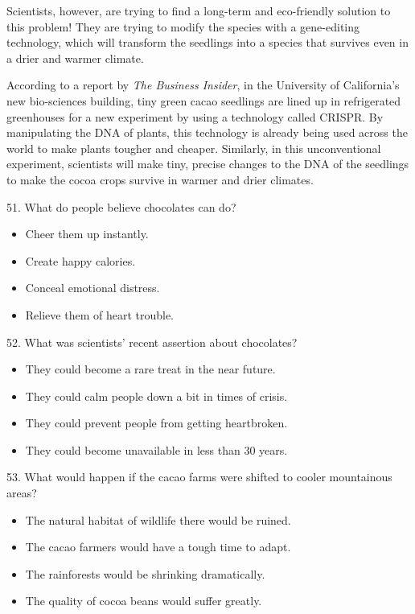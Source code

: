 \documentclass[UTF8,11pt]{ctexart}
\begin{document}
Scientists, however, are trying to find a long-term and eco-friendly solution to this problem! They are trying to modify the species with a gene-editing technology, which will transform the seedlings into a species that survives even in a drier and warmer climate.


According to a report by \textit{The Business Insider}, in the University of California’s new bio-sciences building, tiny green cacao seedlings are lined up in refrigerated greenhouses for a new experiment by using a technology called CRISPR. By manipulating the DNA of plants, this technology is already being used across the world to make plants tougher and cheaper. Similarly, in this unconventional experiment, scientists will make tiny, precise changes to the DNA of the seedlings to make the cocoa crops survive in warmer and drier climates.


51. What do people believe chocolates can do?


\begin{itemize}[leftmargin=2em,itemsep=.2em,topsep=.4em]\item[A.] Cheer them up instantly.
\item[B.] Create happy calories.
\item[C.] Conceal emotional distress.
\item[D.] Relieve them of heart trouble.
\end{itemize}

52. What was scientists’ recent assertion about chocolates?


\begin{itemize}[leftmargin=2em,itemsep=.2em,topsep=.4em]\item[A.] They could become a rare treat in the near future.
\item[B.] They could calm people down a bit in times of crisis.
\item[C.] They could prevent people from getting heartbroken.
\item[D.] They could become unavailable in less than 30 years.
\end{itemize}

53. What would happen if the cacao farms were shifted to cooler mountainous areas?


\begin{itemize}[leftmargin=2em,itemsep=.2em,topsep=.4em]\item[A.] The natural habitat of wildlife there would be ruined.
\item[B.] The cacao farmers would have a tough time to adapt.
\item[C.] The rainforests would be shrinking dramatically.
\item[D.] The quality of cocoa beans would suffer greatly.
\end{itemize}
\end{document}
